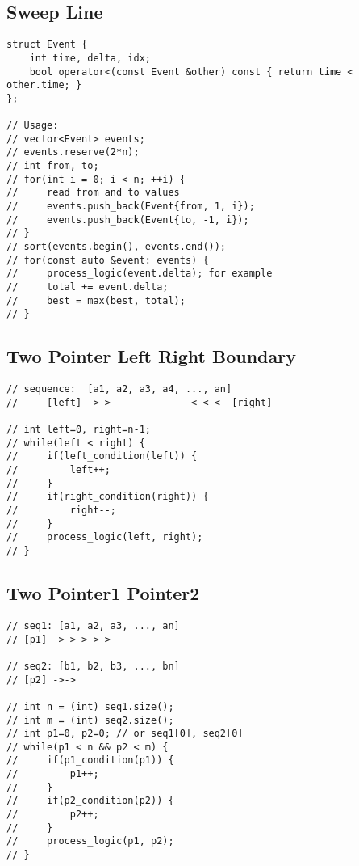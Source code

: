 \documentclass[10pt,letterpaper,twocolumn,twosided]{article}
\begin{document}
\subsection{Sweep Line}
\begin{lstlisting}
struct Event {
    int time, delta, idx;
    bool operator<(const Event &other) const { return time < other.time; }
};

// Usage:
// vector<Event> events;
// events.reserve(2*n);
// int from, to;
// for(int i = 0; i < n; ++i) {
//     read from and to values
//     events.push_back(Event{from, 1, i});
//     events.push_back(Event{to, -1, i});
// }
// sort(events.begin(), events.end());
// for(const auto &event: events) {
//     process_logic(event.delta); for example
//     total += event.delta;
//     best = max(best, total);
// }
\end{lstlisting}

\subsection{Two Pointer Left Right Boundary}
\begin{lstlisting}
// sequence:  [a1, a2, a3, a4, ..., an]
//     [left] ->->              <-<-<- [right]

// int left=0, right=n-1;
// while(left < right) {
//     if(left_condition(left)) {
//         left++;
//     }
//     if(right_condition(right)) {
//         right--;
//     }
//     process_logic(left, right);
// }
\end{lstlisting}

\subsection{Two Pointer1 Pointer2}
\begin{lstlisting}
// seq1: [a1, a2, a3, ..., an]
// [p1] ->->->->->

// seq2: [b1, b2, b3, ..., bn]
// [p2] ->->

// int n = (int) seq1.size();
// int m = (int) seq2.size();
// int p1=0, p2=0; // or seq1[0], seq2[0]
// while(p1 < n && p2 < m) {
//     if(p1_condition(p1)) {
//         p1++;
//     }
//     if(p2_condition(p2)) {
//         p2++;
//     }
//     process_logic(p1, p2);
// }
\end{lstlisting}
\end{document}
